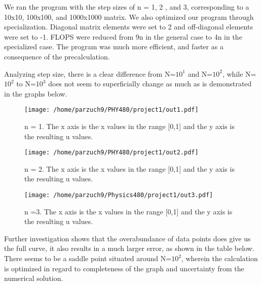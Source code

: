\documentclass[10pt,showpacs,preprintnumbers,footinbib,amsmath,amssymb,aps,prl,twocolumn,groupedaddress,superscriptaddress,showkeys]{revtex4-1}
\begin{document}
 We ran the program with the step sizes of n = 1, 2 , and 3, corresponding to a 10x10, 100x100, and 1000x1000 matrix. We also optimized our program through specialization. Diagonal matrix elements were set to 2 and off-diagonal elements were set to -1. FLOPS were reduced from 9n in the general case to 4n in the specialized case. The program was much more efficient, and faster as a consequence of the precalculation. 

 Analyzing step size, there is a clear difference from N=$10^{1}$ and N=$10^{2}$, while N=$10^{2}$ to N=$10^{3}$ does not seem to superficially change as much as is demonstrated in the graphs below.
 
\begin{figure}[!ht]
	\centering
	\texttt{[image: /home/parzuch9/PHY480/project1/out1.pdf]}
	\label{uvx}
	\caption{ n = 1. The x axis is the x values in the range [0,1] and the y axis is the resulting u values.}
\end{figure}

\begin{figure}[!ht]
	\centering
	\texttt{[image: /home/parzuch9/PHY480/project1/out2.pdf]}

	\label{uvx}
	\caption{n = 2. The x axis is the x values in the range [0,1] and the y axis is the resulting u values.}
\end{figure}

\begin{figure}[!ht]
	\centering
	\texttt{[image: /home/parzuch9/Physics480/project1/out3.pdf]}

	\label{uvx}
	\caption{n =3.  The x axis is the x values in the range [0,1] and the y axis is the resulting u values.}
\end{figure}

Further investigation shows that the overabundance of data points does give us the full curve, it also results in a much larger error, as shown in the table below. There seems to be a saddle point situated around N=$10^{2}$, wherein the calculation is optimized in regard to completeness of the graph and uncertainty from the numerical solution.
\end{document}
